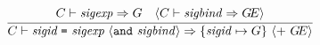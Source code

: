 




\begin{equation}	%
\label{sigbind-rule}
\frac{\begin{array}{lr}
       \C\ts\sigexp\ra\G &
        \langle\C\ts\sigbind\ra\GE\rangle
      \end{array}}
     { \C\ts\sigbinder\ra\{\sigid\mapsto\G\}
       \ \langle +\ \GE\rangle}\index{42.1}
\end{equation}

